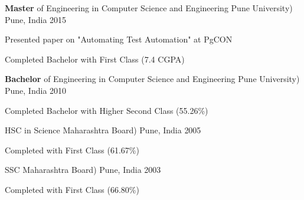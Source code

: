 

\begin{cventries}

  \cventry
    {\textbf{Master} of Engineering in Computer Science and Engineering} %
    {Pune University)} %
    {Pune, India} %
    {2015} %
    {
      \begin{cvitems} %
        \item {Presented paper on "Automating Test Automation" at PgCON}
		\item {Completed Bachelor with First Class (7.4 CGPA)}
      \end{cvitems}
    }
	\cventry
    {\textbf{Bachelor} of Engineering in Computer Science and Engineering} %
    {Pune University)} %
    {Pune, India} %
    {2010} %
    {
      \begin{cvitems} %
        \item {Completed Bachelor with Higher Second Class (55.26\%)}
      \end{cvitems}
    }
	\cventry
    {HSC in Science} %
    {Maharashtra Board)} %
    {Pune, India} %
    {2005} %
    {
      \begin{cvitems} %
        \item {Completed with First Class (61.67\%)}
      \end{cvitems}
    }
	\cventry
    {SSC} %
    {Maharashtra Board)} %
    {Pune, India} %
    {2003} %
    {
      \begin{cvitems} %
        \item {Completed with First Class (66.80\%)}
      \end{cvitems}
    }
\end{cventries}
